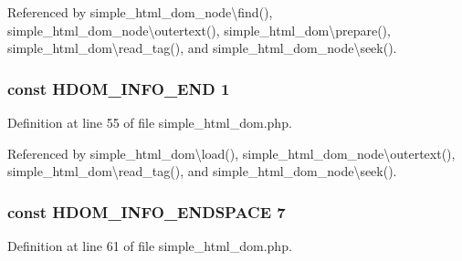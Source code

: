 Referenced by simple\+\_\+html\+\_\+dom\+\_\+node\textbackslash{}find(), simple\+\_\+html\+\_\+dom\+\_\+node\textbackslash{}outertext(), simple\+\_\+html\+\_\+dom\textbackslash{}prepare(), simple\+\_\+html\+\_\+dom\textbackslash{}read\+\_\+tag(), and simple\+\_\+html\+\_\+dom\+\_\+node\textbackslash{}seek().

\hypertarget{simple__html__dom_8php_adeab85900893208119e3d1f2b3e2fca1}{}
\subsubsection[{H\+D\+O\+M\+\_\+\+I\+N\+F\+O\+\_\+\+E\+N\+D}]{\setlength{\rightskip}{0pt plus 5cm}const H\+D\+O\+M\+\_\+\+I\+N\+F\+O\+\_\+\+E\+N\+D 1}\label{simple__html__dom_8php_adeab85900893208119e3d1f2b3e2fca1}


Definition at line 55 of file simple\+\_\+html\+\_\+dom.\+php.



Referenced by simple\+\_\+html\+\_\+dom\textbackslash{}load(), simple\+\_\+html\+\_\+dom\+\_\+node\textbackslash{}outertext(), simple\+\_\+html\+\_\+dom\textbackslash{}read\+\_\+tag(), and simple\+\_\+html\+\_\+dom\+\_\+node\textbackslash{}seek().

\hypertarget{simple__html__dom_8php_a45cce2cf42d5ed669087cad509c1476c}{}
\subsubsection[{H\+D\+O\+M\+\_\+\+I\+N\+F\+O\+\_\+\+E\+N\+D\+S\+P\+A\+C\+E}]{\setlength{\rightskip}{0pt plus 5cm}const H\+D\+O\+M\+\_\+\+I\+N\+F\+O\+\_\+\+E\+N\+D\+S\+P\+A\+C\+E 7}\label{simple__html__dom_8php_a45cce2cf42d5ed669087cad509c1476c}


Definition at line 61 of file simple\+\_\+html\+\_\+dom.\+php.



